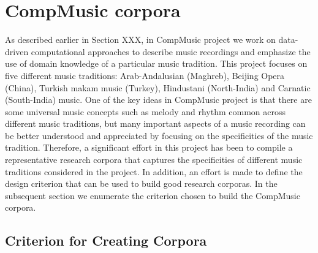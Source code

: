 %


\section{CompMusic corpora}

As described earlier in Section XXX, in CompMusic project we work on data-driven computational approaches to describe music recordings and emphasize the use of domain knowledge of a particular music tradition. This project focuses on five different music traditions: Arab-Andalusian (Maghreb), Beijing Opera (China), Turkish makam music (Turkey), Hindustani (North-India) and Carnatic (South-India) music. One of the key ideas in CompMusic project is that there are some universal music concepts such as melody and rhythm common across different music traditions, but many important aspects of a music recording can be better understood and appreciated by focusing on the specificities of the music tradition. Therefore, a significant effort in this project has been to compile a representative research corpora that captures the specificities of different music traditions considered in the project. In addition, an effort is made to define the design criterion that can be used to build good research corporas. In the subsequent section we enumerate the criterion chosen to build the CompMusic corpora.

\subsection{Criterion for Creating Corpora}
\label{sec:datasets_criterion_for_corpora}


